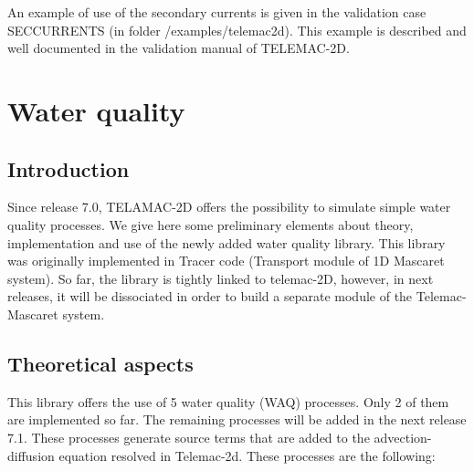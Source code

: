 \documentclass{article} %
\begin{document}
 An example of use of the secondary currents is given in the validation case SECCURRENTS (in folder /examples/telemac2d). This example is described and well documented in the validation manual of TELEMAC-2D.




\section{ Water quality}


\subsection{  Introduction}



 Since release 7.0, TELAMAC-2D offers the possibility to simulate simple water quality processes. We give here some preliminary elements about theory, implementation and use of the newly added water quality library. This library was originally implemented in Tracer code (Transport module of 1D Mascaret system).  So far, the library is tightly linked to telemac-2D, however, in next releases, it will be dissociated in order to build a separate module of the Telemac-Mascaret system.


\subsection{ Theoretical aspects}

 This library offers the use of 5 water quality (WAQ) processes. Only 2 of them are implemented so far. The remaining processes will be added in the next release 7.1. These processes generate source terms that are added to the advection-diffusion equation resolved in Telemac-2d. These processes are the following:
\end{document}
